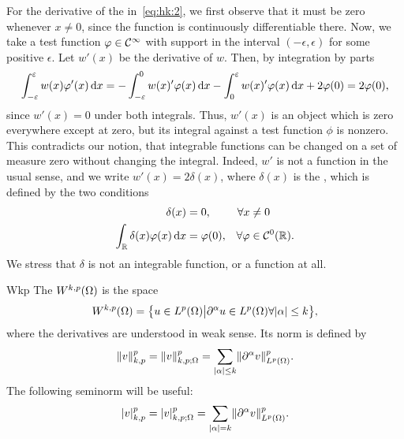 \begin{example}
  For the derivative of the 
  in~\eqref{eq:hk:2}, we first observe that it must be zero whenever
  $x\neq 0$, since the function is continuously differentiable
  there. Now, we take a test function $\varphi\in\mathcal C^\infty$ with support
  in the interval $(-\epsilon,\epsilon)$ for some positive
  $\epsilon$. Let $w'(x)$ be the derivative of $w$. Then, by
  integration by parts
  \begin{gather*}
    \int_{-\varepsilon}^\varepsilon w(x) \varphi'(x)\,\mathrm{d} x
    = -\int_{-\varepsilon}^0 w(x)' \varphi(x)\,\mathrm{d} x
    -\int_0^\varepsilon w(x)' \varphi(x)\,\mathrm{d} x
    + 2 \varphi(0) = 2\varphi(0),
  \end{gather*}
  since $w'(x) = 0$ under both integrals. Thus, $w'(x)$ is an object
  which is zero everywhere except at zero, but its integral against a
  test function $\phi$ is nonzero. This contradicts our notion, that
  integrable functions can be changed on a set of measure zero without
  changing the integral. Indeed, $w'$ is not a function in the usual
  sense, and we write $w'(x) = 2 \delta(x)$, where $\delta(x)$ is the
  , which is defined by the two
  conditions
  \begin{gather*}
    \begin{alignedat}{2}
      \delta(x) &= 0, & \forall x & \neq 0
      \\
      \int_\mathbb R \delta(x) \varphi(x)\,\mathrm{d} x &= \varphi(0), \quad & \forall \varphi
      &\in \mathcal C^0(\mathbb R).
    \end{alignedat}
  \end{gather*}
  We stress that $\delta$ is not an integrable function, or a function
  at all.
\end{example}

\begin{Definition}{Wkp}
  The  $W^{k,p}(\Omega)$ is the space
  \begin{gather}
    W^{k,p}(\Omega) = \bigl\{
    u\in L^p(\Omega) \big|
    \partial^\alpha u\in L^p(\Omega) \forall \lvert\alpha\rvert \le k
    \bigr\},
  \end{gather}
  where the derivatives are understood in weak sense. Its norm is
  defined by
  \begin{gather}
    \lVert v\rVert_{k,p}^p = \lVert v\rVert_{k,p;\Omega}^p
    = \sum_{\lvert\alpha\rvert \le k} \lVert\partial^\alpha v\rVert_{L^p(\Omega)}^p.
  \end{gather}
  The following seminorm will be useful:
  \begin{gather}
    \lvert v\rvert_{k,p}^p = \lvert v\rvert_{k,p;\Omega}^p
    = \sum_{\lvert\alpha\rvert = k} \lVert\partial^\alpha v\rVert_{L^p(\Omega)}^p.
  \end{gather}
\end{Definition}

